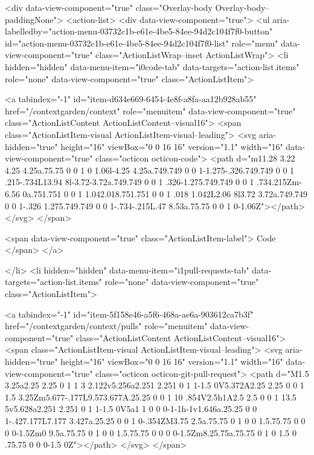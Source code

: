       <div data-view-component="true" class="Overlay-body Overlay-body--paddingNone">          <action-list>
  <div data-view-component="true">
    <ul aria-labelledby="action-menu-03732c1b-e61e-4be5-84ee-94d2c104f7f0-button" id="action-menu-03732c1b-e61e-4be5-84ee-94d2c104f7f0-list" role="menu" data-view-component="true" class="ActionListWrap--inset ActionListWrap">
        <li hidden="hidden" data-menu-item="i0code-tab" data-targets="action-list.items" role="none" data-view-component="true" class="ActionListItem">
    
    
    <a tabindex="-1" id="item-d634e669-6454-4e8f-a8fa-aa12b928ab55" href="/contextgarden/context" role="menuitem" data-view-component="true" class="ActionListContent ActionListContent--visual16">
        <span class="ActionListItem-visual ActionListItem-visual--leading">
          <svg aria-hidden="true" height="16" viewBox="0 0 16 16" version="1.1" width="16" data-view-component="true" class="octicon octicon-code">
    <path d="m11.28 3.22 4.25 4.25a.75.75 0 0 1 0 1.06l-4.25 4.25a.749.749 0 0 1-1.275-.326.749.749 0 0 1 .215-.734L13.94 8l-3.72-3.72a.749.749 0 0 1 .326-1.275.749.749 0 0 1 .734.215Zm-6.56 0a.751.751 0 0 1 1.042.018.751.751 0 0 1 .018 1.042L2.06 8l3.72 3.72a.749.749 0 0 1-.326 1.275.749.749 0 0 1-.734-.215L.47 8.53a.75.75 0 0 1 0-1.06Z"></path>
</svg>
        </span>
      
        <span data-view-component="true" class="ActionListItem-label">
          Code
</span>      
</a>
  
</li>
        <li hidden="hidden" data-menu-item="i1pull-requests-tab" data-targets="action-list.items" role="none" data-view-component="true" class="ActionListItem">
    
    
    <a tabindex="-1" id="item-5f158e46-a5f6-468a-ae6a-903612ca7b3f" href="/contextgarden/context/pulls" role="menuitem" data-view-component="true" class="ActionListContent ActionListContent--visual16">
        <span class="ActionListItem-visual ActionListItem-visual--leading">
          <svg aria-hidden="true" height="16" viewBox="0 0 16 16" version="1.1" width="16" data-view-component="true" class="octicon octicon-git-pull-request">
    <path d="M1.5 3.25a2.25 2.25 0 1 1 3 2.122v5.256a2.251 2.251 0 1 1-1.5 0V5.372A2.25 2.25 0 0 1 1.5 3.25Zm5.677-.177L9.573.677A.25.25 0 0 1 10 .854V2.5h1A2.5 2.5 0 0 1 13.5 5v5.628a2.251 2.251 0 1 1-1.5 0V5a1 1 0 0 0-1-1h-1v1.646a.25.25 0 0 1-.427.177L7.177 3.427a.25.25 0 0 1 0-.354ZM3.75 2.5a.75.75 0 1 0 0 1.5.75.75 0 0 0 0-1.5Zm0 9.5a.75.75 0 1 0 0 1.5.75.75 0 0 0 0-1.5Zm8.25.75a.75.75 0 1 0 1.5 0 .75.75 0 0 0-1.5 0Z"></path>
</svg>
        </span>
      
